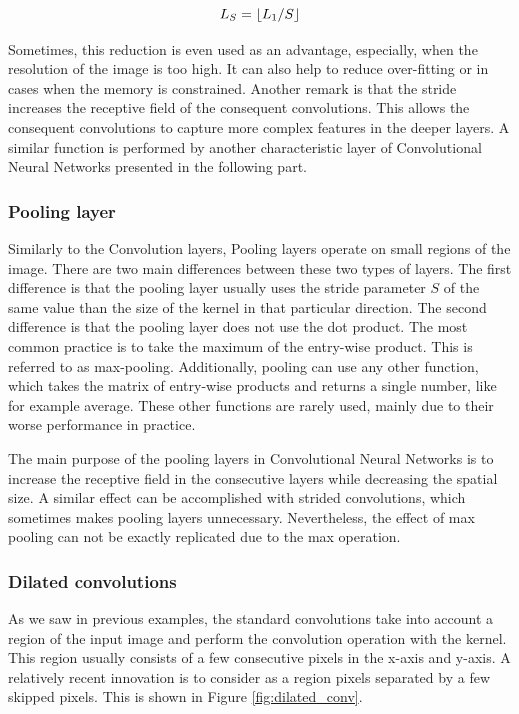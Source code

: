 \begin{equation}
    L_S = \floor*{L_1 / S}
    \label{eq:stride}
\end{equation}

Sometimes, this reduction is even used as an advantage, especially, when the resolution of the image is too high.
It can also help to reduce over-fitting or in cases when the memory is constrained.
Another remark is that the stride increases the receptive field of the consequent convolutions.
This allows the consequent convolutions to capture more complex features in the deeper layers.
A similar function is performed by another characteristic layer of Convolutional Neural Networks presented in the following part.

\subsubsection{Pooling layer}
Similarly to the Convolution layers, Pooling layers operate on small regions of the image.
There are two main differences between these two types of layers.
The first difference is that the pooling layer usually uses the stride parameter $S$ of the same value than the size of the kernel in that particular direction.
The second difference is that the pooling layer does not use the dot product.
The most common practice is to take the maximum of the entry-wise product.
This is referred to as max-pooling.
Additionally, pooling can use any other function, which takes the matrix of entry-wise products and returns a single number, like for example average.
These other functions are rarely used, mainly due to their worse performance in practice. 

The main purpose of the pooling layers in Convolutional Neural Networks is to increase the receptive field in the consecutive layers while decreasing the spatial size.
A similar effect can be accomplished with strided convolutions, which sometimes makes pooling layers unnecessary.
Nevertheless, the effect of max pooling can not be exactly replicated due to the max operation.

\subsubsection{Dilated convolutions\cite{yu2015multi}}
As we saw in previous examples, the standard convolutions take into account a region of the input image and perform the convolution operation with the kernel.
This region usually consists of a few consecutive pixels in the x-axis and y-axis.
A relatively recent innovation is to consider as a region pixels separated by a few skipped pixels.
This is shown in Figure \ref{fig:dilated_conv}.

